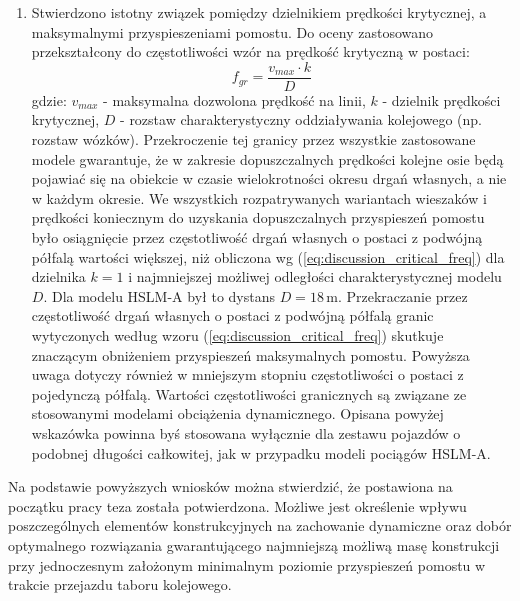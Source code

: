\begin{enumerate}
\item Stwierdzono istotny związek pomiędzy dzielnikiem prędkości krytycznej, a maksymalnymi przyspieszeniami pomostu. Do oceny zastosowano przekształcony do częstotliwości wzór na prędkość krytyczną w postaci:
\begin{equation} \label{eq:discussion_critical_freq}
	f_{gr} = \frac{v_{max}\cdot k}{D} 
\end{equation}
gdzie: $v_{max}$ - maksymalna dozwolona prędkość na linii, $k$ - dzielnik prędkości krytycznej, $D$ - rozstaw charakterystyczny oddziaływania kolejowego (np. rozstaw wózków). Przekroczenie tej granicy przez wszystkie zastosowane modele gwarantuje, że w zakresie dopuszczalnych prędkości kolejne osie będą pojawiać się na obiekcie w czasie wielokrotności okresu drgań własnych, a nie w każdym okresie. We wszystkich rozpatrywanych wariantach wieszaków i prędkości koniecznym do uzyskania dopuszczalnych przyspieszeń pomostu było osiągnięcie przez częstotliwość drgań własnych o postaci z podwójną półfalą wartości większej, niż obliczona wg (\ref{eq:discussion_critical_freq}) dla dzielnika $k=1$ i najmniejszej możliwej odległości charakterystycznej modelu $D$. Dla modelu HSLM-A był to dystans $D=18\,\mathrm{m}$. Przekraczanie przez częstotliwość drgań własnych o postaci z podwójną półfalą granic wytyczonych według wzoru (\ref{eq:discussion_critical_freq}) skutkuje znaczącym obniżeniem przyspieszeń maksymalnych pomostu. Powyższa uwaga dotyczy również w mniejszym stopniu częstotliwości o postaci z pojedynczą półfalą. Wartości częstotliwości granicznych są związane ze stosowanymi modelami obciążenia dynamicznego. Opisana powyżej wskazówka powinna byś stosowana wyłącznie dla zestawu pojazdów o podobnej długości całkowitej, jak w przypadku modeli pociągów HSLM-A.




\end{enumerate}

Na podstawie powyższych wniosków można stwierdzić, że postawiona na początku pracy teza została potwierdzona. Możliwe jest określenie wpływu poszczególnych elementów konstrukcyjnych na zachowanie dynamiczne oraz dobór optymalnego rozwiązania gwarantującego najmniejszą możliwą masę konstrukcji przy jednoczesnym założonym minimalnym poziomie przyspieszeń pomostu w trakcie przejazdu taboru kolejowego.

